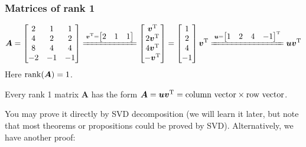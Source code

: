 \subsubsection{Matrices of rank 1}
\begin{example}
\[
\bm A = \begin{bmatrix}
2&1&1\\4&2&2\\8&4&4\\-2&-1&-1
\end{bmatrix}\xlongequal{\bm v\trans = \begin{bmatrix}
2&1&1
\end{bmatrix}}\begin{bmatrix}
\bm v\trans\\2\bm v\trans\\4\bm v\trans\\-\bm v\trans
\end{bmatrix} = \begin{bmatrix}
1\\2\\4\\-1
\end{bmatrix}\bm v\trans\xlongequal{\bm u=\begin{bmatrix}
1&2&4&-1
\end{bmatrix}\trans}\bm u\bm v\trans
\]
Here $\operatorname{rank}(\bm A) = 1$.
\end{example}
\begin{proposition}
Every rank 1 matrix $\bm A$ has the form $\bm A = \bm u\bm v^{\mathrm T} = \text{column vector}\times\text{row vector}$.
\end{proposition}
You may prove it directly by SVD decomposition (we will learn it later, but note that most theorems or propositions could be proved by SVD). Alternatively, we have another proof:
